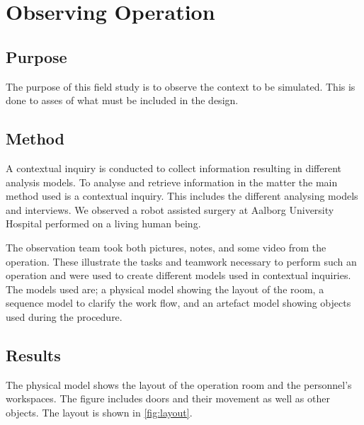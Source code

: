 \chapter*{Observing Operation}

\section*{Purpose}
The purpose of this field study is to observe the context to be simulated. This is done to asses of what must be included in the design.

\section*{Method}
A contextual inquiry is conducted to collect information resulting in different analysis models.
To analyse and retrieve information in the matter the main method used is a contextual inquiry. This includes the different analysing models and interviews. We observed a robot assisted surgery at Aalborg University Hospital performed on a living human being.

The observation team took both pictures, notes, and some video from the operation. These illustrate the tasks and teamwork necessary to perform such an operation and were used to create different models used in contextual inquiries. The models used are; a physical model showing the layout of the room, a sequence model to clarify the work flow, and an artefact model showing objects used during the procedure.

\section*{Results}
The physical model shows the layout of the operation room and the personnel's workspaces. The figure includes doors and their movement as well as other objects. The layout is shown in \autoref{fig:layout}.

